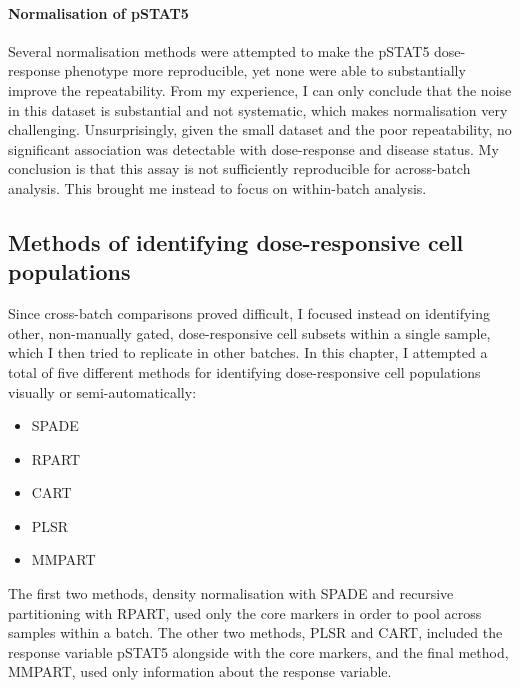 

\paragraph{Normalisation of pSTAT5}

Several normalisation methods were attempted to make the pSTAT5 dose-response phenotype more reproducible,
yet none were able to substantially improve the repeatability.
From my experience, I can only conclude that the noise in this dataset is substantial and not systematic, which makes normalisation very challenging.
Unsurprisingly, given the small dataset and the poor repeatability, no significant association was detectable with dose-response and disease status.
My conclusion is that this assay is not sufficiently reproducible for across-batch analysis.
This brought me instead to focus on within-batch analysis.


\subsection{ Methods of identifying dose-responsive cell populations }


Since cross-batch comparisons proved difficult, I focused instead on identifying other, non-manually gated, dose-responsive cell subsets within a single sample, which I then tried to replicate in other batches.
In this chapter, I attempted a total of five different methods for identifying dose-responsive cell populations visually or semi-automatically:
\begin{itemize}
    \item SPADE
    \item RPART
    \item CART
    \item PLSR
    \item MMPART
\end{itemize}
The first two methods, density normalisation with SPADE and recursive partitioning with RPART, used only the core markers in order to pool across samples within a batch.
The other two methods, PLSR and CART, included the response variable pSTAT5 alongside with the core markers, and the final method, MMPART, used only information about the response variable.

